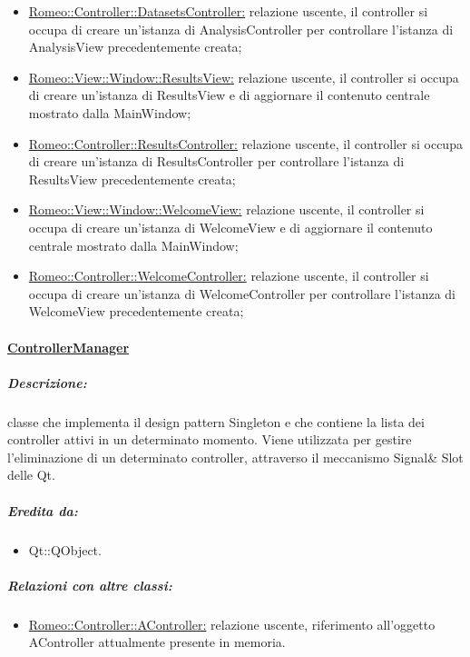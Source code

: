 \begin{itemize}
				\item \hyperref[controller_sa]{Romeo::Controller::DatasetsController:} relazione uscente, il controller si occupa di creare un'istanza di AnalysisController per controllare l'istanza di AnalysisView precedentemente creata;
				\item \hyperref[vrv]{Romeo::View::Window::ResultsView:} relazione uscente, il controller si occupa di creare un'istanza di ResultsView e di aggiornare il contenuto centrale mostrato dalla MainWindow;
				\item \hyperref[controller_vr]{Romeo::Controller::ResultsController:} relazione uscente, il controller si occupa di creare un'istanza di ResultsController per controllare l'istanza di ResultsView precedentemente creata;
				\item \hyperref[wv]{Romeo::View::Window::WelcomeView:} relazione uscente, il controller si occupa di creare un'istanza di WelcomeView e di aggiornare il contenuto centrale mostrato dalla MainWindow;
				\item \hyperref[controller_wp]{Romeo::Controller::WelcomeController:} relazione uscente, il controller si occupa di creare un'istanza di WelcomeController per controllare l'istanza di WelcomeView precedentemente creata;
			\end{itemize}
			
	\paragraph{\underline{ControllerManager}}
	\label{controller_mn} 
		\subparagraph{Descrizione:} classe che implementa il design pattern\g{} Singleton e che contiene la lista dei controller attivi in un determinato momento. Viene utilizzata per gestire l'eliminazione di un determinato controller, attraverso il meccanismo Signal\& Slot\g{} delle Qt\glossario{}.
	\subparagraph{Eredita da:}
		\begin{itemize}
			\item Qt::QObject.
		\end{itemize}
	\subparagraph{Relazioni con altre classi:}
		\begin{itemize}
			\item \hyperref[controller_a]{Romeo::Controller::AController:} relazione uscente, riferimento all'oggetto AController attualmente presente in memoria.
		\end{itemize}
	

